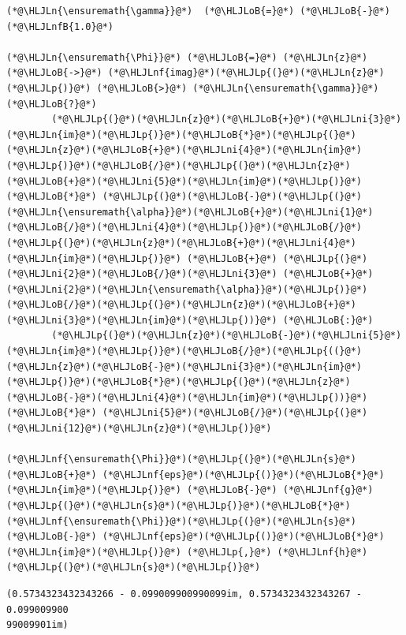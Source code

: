 \documentclass[12pt,a4paper]{article}
\newcommand{\HLJLn}[1]{#1}
\newcommand{\HLJLnf}[1]{\textcolor[RGB]{66,102,213}{#1}}
\newcommand{\HLJLnfB}[1]{\textcolor[RGB]{59,151,46}{#1}}
\newcommand{\HLJLni}[1]{\textcolor[RGB]{59,151,46}{#1}}
\newcommand{\HLJLoB}[1]{\textcolor[RGB]{102,102,102}{\textbf{#1}}}
\newcommand{\HLJLp}[1]{#1}
\begin{document}
\begin{lstlisting}
(*@\HLJLn{\ensuremath{\gamma}}@*)  (*@\HLJLoB{=}@*) (*@\HLJLoB{-}@*)(*@\HLJLnfB{1.0}@*)

(*@\HLJLn{\ensuremath{\Phi}}@*) (*@\HLJLoB{=}@*) (*@\HLJLn{z}@*) (*@\HLJLoB{->}@*) (*@\HLJLnf{imag}@*)(*@\HLJLp{(}@*)(*@\HLJLn{z}@*)(*@\HLJLp{)}@*) (*@\HLJLoB{>}@*) (*@\HLJLn{\ensuremath{\gamma}}@*) (*@\HLJLoB{?}@*) 
        (*@\HLJLp{(}@*)(*@\HLJLn{z}@*)(*@\HLJLoB{+}@*)(*@\HLJLni{3}@*)(*@\HLJLn{im}@*)(*@\HLJLp{)}@*)(*@\HLJLoB{*}@*)(*@\HLJLp{(}@*)(*@\HLJLn{z}@*)(*@\HLJLoB{+}@*)(*@\HLJLni{4}@*)(*@\HLJLn{im}@*)(*@\HLJLp{)}@*)(*@\HLJLoB{/}@*)(*@\HLJLp{(}@*)(*@\HLJLn{z}@*)(*@\HLJLoB{+}@*)(*@\HLJLni{5}@*)(*@\HLJLn{im}@*)(*@\HLJLp{)}@*) (*@\HLJLoB{*}@*) (*@\HLJLp{(}@*)(*@\HLJLoB{-}@*)(*@\HLJLp{(}@*)(*@\HLJLn{\ensuremath{\alpha}}@*)(*@\HLJLoB{+}@*)(*@\HLJLni{1}@*)(*@\HLJLoB{/}@*)(*@\HLJLni{4}@*)(*@\HLJLp{)}@*)(*@\HLJLoB{/}@*)(*@\HLJLp{(}@*)(*@\HLJLn{z}@*)(*@\HLJLoB{+}@*)(*@\HLJLni{4}@*)(*@\HLJLn{im}@*)(*@\HLJLp{)}@*) (*@\HLJLoB{+}@*) (*@\HLJLp{(}@*)(*@\HLJLni{2}@*)(*@\HLJLoB{/}@*)(*@\HLJLni{3}@*) (*@\HLJLoB{+}@*) (*@\HLJLni{2}@*)(*@\HLJLn{\ensuremath{\alpha}}@*)(*@\HLJLp{)}@*)(*@\HLJLoB{/}@*)(*@\HLJLp{(}@*)(*@\HLJLn{z}@*)(*@\HLJLoB{+}@*)(*@\HLJLni{3}@*)(*@\HLJLn{im}@*)(*@\HLJLp{))}@*) (*@\HLJLoB{:}@*)
        (*@\HLJLp{(}@*)(*@\HLJLn{z}@*)(*@\HLJLoB{-}@*)(*@\HLJLni{5}@*)(*@\HLJLn{im}@*)(*@\HLJLp{)}@*)(*@\HLJLoB{/}@*)(*@\HLJLp{((}@*)(*@\HLJLn{z}@*)(*@\HLJLoB{-}@*)(*@\HLJLni{3}@*)(*@\HLJLn{im}@*)(*@\HLJLp{)}@*)(*@\HLJLoB{*}@*)(*@\HLJLp{(}@*)(*@\HLJLn{z}@*)(*@\HLJLoB{-}@*)(*@\HLJLni{4}@*)(*@\HLJLn{im}@*)(*@\HLJLp{))}@*) (*@\HLJLoB{*}@*) (*@\HLJLni{5}@*)(*@\HLJLoB{/}@*)(*@\HLJLp{(}@*)(*@\HLJLni{12}@*)(*@\HLJLn{z}@*)(*@\HLJLp{)}@*)

(*@\HLJLnf{\ensuremath{\Phi}}@*)(*@\HLJLp{(}@*)(*@\HLJLn{s}@*) (*@\HLJLoB{+}@*) (*@\HLJLnf{eps}@*)(*@\HLJLp{()}@*)(*@\HLJLoB{*}@*)(*@\HLJLn{im}@*)(*@\HLJLp{)}@*) (*@\HLJLoB{-}@*) (*@\HLJLnf{g}@*)(*@\HLJLp{(}@*)(*@\HLJLn{s}@*)(*@\HLJLp{)}@*)(*@\HLJLoB{*}@*)(*@\HLJLnf{\ensuremath{\Phi}}@*)(*@\HLJLp{(}@*)(*@\HLJLn{s}@*) (*@\HLJLoB{-}@*) (*@\HLJLnf{eps}@*)(*@\HLJLp{()}@*)(*@\HLJLoB{*}@*)(*@\HLJLn{im}@*)(*@\HLJLp{)}@*) (*@\HLJLp{,}@*) (*@\HLJLnf{h}@*)(*@\HLJLp{(}@*)(*@\HLJLn{s}@*)(*@\HLJLp{)}@*)
\end{lstlisting}

\begin{lstlisting}
(0.5734323432343266 - 0.099009900990099im, 0.5734323432343267 - 0.099009900
99009901im)
\end{lstlisting}
\end{document}
